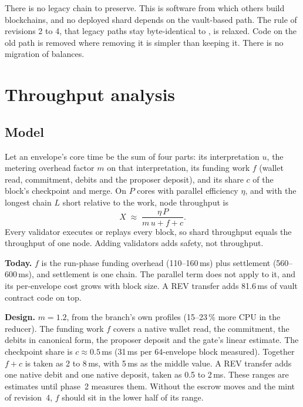 \documentclass[11pt]{article}
\newcommand{\code}{\path}
\begin{document}
There is no legacy chain to preserve. This is software from which others build blockchains, and no deployed shard depends on the vault-based path. The rule of revisions 2 to 4, that legacy paths stay byte-identical to \code{dev}, is relaxed. Code on the old path is removed where removing it is simpler than keeping it. There is no migration of balances.


\section{Throughput analysis}\label{sec:throughput}

\subsection{Model}

Let an envelope's core time be the sum of four parts: its interpretation $u$, the metering overhead factor $m$ on that interpretation, its funding work $f$ (wallet read, commitment, debits and the proposer deposit), and its share $c$ of the block's checkpoint and merge. On $P$ cores with parallel efficiency $\eta$, and with the longest chain $L$ short relative to the work, node throughput is
\[
X \;\approx\; \frac{\eta\,P}{m\,u + f + c}.
\]
Every validator executes or replays every block, so shard throughput equals the throughput of one node. Adding validators adds safety, not throughput.

\textbf{Today.} $f$ is the run-phase funding overhead (110--160\,ms) plus settlement (560--600\,ms), and settlement is one chain. The parallel term does not apply to it, and its per-envelope cost grows with block size. A REV transfer adds 81.6\,ms of vault contract code on top.

\textbf{Design.} $m = 1.2$, from the branch's own profiles (15--23\,\% more CPU in the reducer). The funding work $f$ covers a native wallet read, the commitment, the debits in canonical form, the proposer deposit and the gate's linear estimate. The checkpoint share is $c \approx 0.5$\,ms (31\,ms per 64-envelope block measured). Together $f + c$ is taken as 2 to 8\,ms, with 5\,ms as the middle value. A REV transfer adds one native debit and one native deposit, taken as 0.5 to 2\,ms. These ranges are estimates until phase~2 measures them. Without the escrow moves and the mint of revision~4, $f$ should sit in the lower half of its range.
\end{document}
